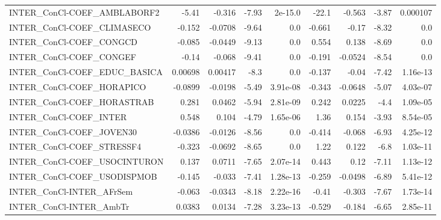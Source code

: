 \begin{tabular}{lrrrrrrrr}
INTER\_ConCl-COEF\_AMBLABORF2           &       -5.41 &       -0.316 &    -7.93 &  2e-15.0 &      -22.1 &      -0.563 &        -3.87 &      0.000107 \\
INTER\_ConCl-COEF\_CLIMASECO            &      -0.152 &      -0.0708 &    -9.64 &      0.0 &     -0.661 &       -0.17 &        -8.32 &           0.0 \\
INTER\_ConCl-COEF\_CONGCD               &      -0.085 &      -0.0449 &    -9.13 &      0.0 &      0.554 &       0.138 &        -8.69 &           0.0 \\
INTER\_ConCl-COEF\_CONGEF               &       -0.14 &       -0.068 &    -9.41 &      0.0 &     -0.191 &     -0.0524 &        -8.54 &           0.0 \\
INTER\_ConCl-COEF\_EDUC\_BASICA          &     0.00698 &      0.00417 &     -8.3 &      0.0 &     -0.137 &       -0.04 &        -7.42 &      1.16e-13 \\
INTER\_ConCl-COEF\_HORAPICO             &     -0.0899 &      -0.0198 &    -5.49 & 3.91e-08 &     -0.343 &     -0.0648 &        -5.07 &      4.03e-07 \\
INTER\_ConCl-COEF\_HORASTRAB            &       0.281 &       0.0462 &    -5.94 & 2.81e-09 &      0.242 &      0.0225 &         -4.4 &      1.09e-05 \\
INTER\_ConCl-COEF\_INTER                &       0.548 &        0.104 &    -4.79 & 1.65e-06 &       1.36 &       0.154 &        -3.93 &      8.54e-05 \\
INTER\_ConCl-COEF\_JOVEN30              &     -0.0386 &      -0.0126 &    -8.56 &      0.0 &     -0.414 &      -0.068 &        -6.93 &      4.25e-12 \\
INTER\_ConCl-COEF\_STRESSF4             &      -0.323 &      -0.0692 &    -8.65 &      0.0 &       1.22 &       0.122 &         -6.8 &      1.03e-11 \\
INTER\_ConCl-COEF\_USOCINTURON          &       0.137 &       0.0711 &    -7.65 & 2.07e-14 &      0.443 &        0.12 &        -7.11 &      1.13e-12 \\
INTER\_ConCl-COEF\_USODISPMOB           &      -0.145 &       -0.033 &    -7.41 & 1.28e-13 &     -0.259 &     -0.0498 &        -6.89 &      5.41e-12 \\
INTER\_ConCl-INTER\_AFrSem              &      -0.063 &      -0.0343 &    -8.18 & 2.22e-16 &      -0.41 &      -0.303 &        -7.67 &      1.73e-14 \\
INTER\_ConCl-INTER\_AmbTr               &      0.0383 &       0.0134 &    -7.28 & 3.23e-13 &     -0.529 &      -0.184 &        -6.65 &      2.85e-11 \\

\end{tabular}
